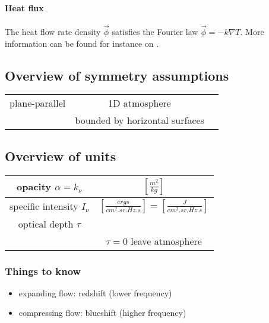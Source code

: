 \documentclass[../main/main.tex]{subfiles}
\begin{document}
\paragraph{Heat flux}
The heat flow rate density $\vec{\phi}$ satisfies the Fourier law $\vec{\phi} = - k\nabla T$. More information can be found for instance on \cite{WikiHeat}.

\subsection{Overview of symmetry assumptions}
\begin{center}
\centering
{\tabulinesep=1.5mm
\begin{tabu}{|c|c|c|}
\hline 
plane-parallel & 1D atmosphere & \\ 
& bounded by horizontal surfaces & \\ \hline
\end{tabu}}
\end{center}


\subsection{Overview of units}
\begin{center}
\centering
{\tabulinesep=1.5mm
\begin{tabu}{|c|c|}
\hline 
opacity $\alpha = k_{\nu}$ & $\left[ \frac{m^2}{kg} \right] $ \\ \hline

specific intensity $I_{\nu}$ & $\left[ \frac{ergs}{cm^2 . sr . Hz . s} \right] = \left[ \frac{J}{cm^2 . sr . Hz . s} \right] $ \\ \hline

optical depth $\tau$ & \\ 
& $\boxed{\tau = 0}$ leave atmosphere \\ \hline
\end{tabu}}
\end{center}

\subsubsection{Things to know}
\begin{itemize}
\item expanding flow: redshift (lower frequency)
\item compressing flow: blueshift (higher frequency)
\end{itemize}


\newpage
\end{document}
